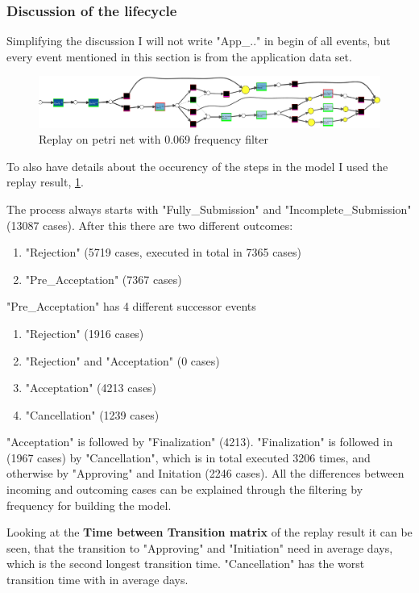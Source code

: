 \subsubsection{Discussion of the lifecycle}
Simplifying the discussion I will not write "App\_.." in begin of all events, but every event mentioned in this section is from the application data set.
\begin{figure}[!htbp]
\centering
\includegraphics[width=0.9\linewidth]{APP_Replay.PNG}
\caption{Replay on petri net with 0.069 frequency filter}
\label{fig:App_EndReplay}
\end{figure}
To also have details about the occurency of the steps in the model I used the replay result, \ref{fig:App_EndReplay}.


The process always starts with "Fully\_Submission" and "Incomplete\_Submission" (13087 cases). After this there are two different outcomes:
\begin{enumerate}
	\item "Rejection" (5719 cases, executed in total in 7365 cases)
	\item "Pre\_Acceptation" (7367 cases)
\end{enumerate}

"Pre\_Acceptation" has 4 different successor events
\begin{enumerate}
	\item "Rejection" (1916 cases)
	\item "Rejection" and "Acceptation" (0 cases)
	\item "Acceptation" (4213 cases)
	\item "Cancellation" (1239 cases)
\end{enumerate}
"Acceptation" is followed by "Finalization" (4213). "Finalization" is followed in (1967 cases) by "Cancellation", which is in total executed 3206 times, and otherwise by "Approving" and Initation (2246 cases).
All the differences between incoming and outcoming cases can be explained through the filtering by frequency for building the model.

Looking at the \textbf{Time between Transition matrix} of the replay result it can be seen, that the transition to "Approving" and "Initiation" need in average  days, which is the second longest transition time. "Cancellation" has the worst transition time with in average  days.

